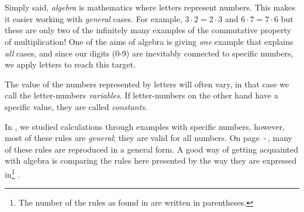 



\section{\algintro}
Simply said, \textit{algebra} is mathematics where letters represent numbers. This makes it easier working with \textsl{general} cases. For example, $ 3\cdot 2=2\cdot3 $ and $ {6\cdot7=7\cdot6} $ but these are only two of the infinitely many examples of the commutative property of multiplication! One of the aims of algebra is giving \textsl{one} example that explains \textsl{all} cases, and since our digits (0-9) are inevitably connected to specific numbers, we apply letters to reach this target. \vsk

The value of the numbers represented by letters will often vary, in that case we call the letter-numbers \textit{variables}. If letter-numbers on the other hand have a specific value, they are called \textit{constants}.

\vsk

In , we studied calculations through examples with specific numbers, however, most of these rules are \textsl{general}; they are valid for all numbers. On page \pageref{regstart}\,-\,\pageref{regslutt}, many of these rules are reproduced in a general form. A good way of getting acquainted with algebra is comparing the rules here presented by the way they are expressed in\footnote{The number of the rules as found in  are written in parentheses.} . \vsk

\regv
\label{regstart}
\reg[\adkom\;(\ref{adkom}) \label{adkomalg}]{\vs
\[ a+ b =b+a \]
}
\eks{ \vsb
\[ 7+ 5=5+7 \]
} \vsk \vsk

\reg[\gangkom\;(\ref{gangkom})]{\vs
	\[ a\cdot b =b\cdot a \]
}
\eks[1]{ \vsb
	\[ 9\cdot 8=8\cdot9 \]
}
\eks[2]{ \vsb
\[  8\cdot a= a\cdot 8  \]
}
\newpage
{}
\vsk 

\reg[\brdef\;(\ref{brdef})]{
\[ a:b=\frac{a}{b} \]
}
\eks[]{ \vs
\[a:2= \frac{a}{2} \]
}
 \vsk 


